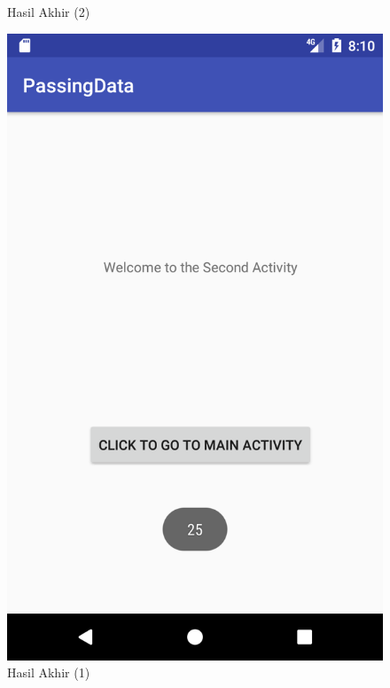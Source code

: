 \documentclass{scrartcl}
\begin{document}
\begin{enumerate}
\begin{figure}[htbp]
\begin{minipage}{.5\textwidth}
			\caption{Hasil Akhir (2)}
			\label{fig:screenshot_1496841043}
		\end{minipage}
	\end{figure}

	\begin{figure}[htbp]
		\begin{minipage}{.5\textwidth}
			\centering
			\includegraphics[width=0.7\linewidth]{Screenshot_1496841045}
			\caption{Hasil Akhir (1)}
			\label{fig:screenshot_1496841045}
		\end{minipage}
		\begin{minipage}{.5\textwidth}
			\centering

\end{minipage}
\end{figure}
\end{enumerate}
\end{document}
